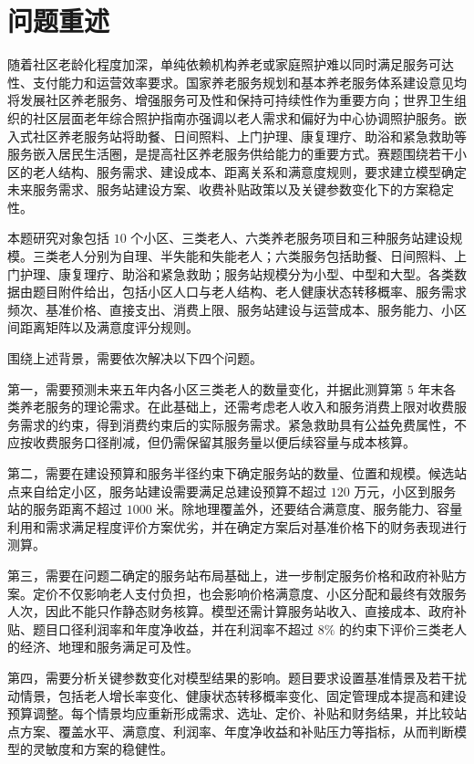 \section{问题重述}

随着社区老龄化程度加深，单纯依赖机构养老或家庭照护难以同时满足服务可达性、支付能力和运营效率要求。国家养老服务规划和基本养老服务体系建设意见均将发展社区养老服务、增强服务可及性和保持可持续性作为重要方向\cite{statecouncil2021,basicservice2023}；世界卫生组织的社区层面老年综合照护指南亦强调以老人需求和偏好为中心协调照护服务\cite{who2017icope}。嵌入式社区养老服务站将助餐、日间照料、上门护理、康复理疗、助浴和紧急救助等服务嵌入居民生活圈，是提高社区养老服务供给能力的重要方式。赛题围绕若干小区的老人结构、服务需求、建设成本、距离关系和满意度规则，要求建立模型确定未来服务需求、服务站建设方案、收费补贴政策以及关键参数变化下的方案稳定性。

本题研究对象包括 $10$ 个小区、三类老人、六类养老服务项目和三种服务站建设规模。三类老人分别为自理、半失能和失能老人；六类服务包括助餐、日间照料、上门护理、康复理疗、助浴和紧急救助；服务站规模分为小型、中型和大型。各类数据由题目附件给出，包括小区人口与老人结构、老人健康状态转移概率、服务需求频次、基准价格、直接支出、消费上限、服务站建设与运营成本、服务能力、小区间距离矩阵以及满意度评分规则。

围绕上述背景，需要依次解决以下四个问题。

第一，需要预测未来五年内各小区三类老人的数量变化，并据此测算第 $5$ 年末各类养老服务的理论需求。在此基础上，还需考虑老人收入和服务消费上限对收费服务需求的约束，得到消费约束后的实际服务需求。紧急救助具有公益免费属性，不应按收费服务口径削减，但仍需保留其服务量以便后续容量与成本核算。

第二，需要在建设预算和服务半径约束下确定服务站的数量、位置和规模。候选站点来自给定小区，服务站建设需要满足总建设预算不超过 $120$ 万元，小区到服务站的服务距离不超过 $1000$ 米。除地理覆盖外，还要结合满意度、服务能力、容量利用和需求满足程度评价方案优劣，并在确定方案后对基准价格下的财务表现进行测算。

第三，需要在问题二确定的服务站布局基础上，进一步制定服务价格和政府补贴方案。定价不仅影响老人支付负担，也会影响价格满意度、小区分配和最终有效服务人次，因此不能只作静态财务核算。模型还需计算服务站收入、直接成本、政府补贴、题目口径利润率和年度净收益，并在利润率不超过 $8\%$ 的约束下评价三类老人的经济、地理和服务满足可及性。

第四，需要分析关键参数变化对模型结果的影响。题目要求设置基准情景及若干扰动情景，包括老人增长率变化、健康状态转移概率变化、固定管理成本提高和建设预算调整。每个情景均应重新形成需求、选址、定价、补贴和财务结果，并比较站点方案、覆盖水平、满意度、利润率、年度净收益和补贴压力等指标，从而判断模型的灵敏度和方案的稳健性。
